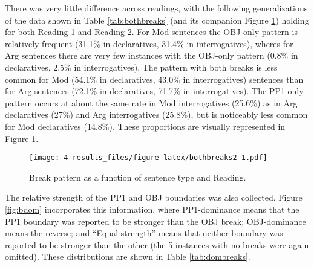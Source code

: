 \documentclass[11pt,oneside]{book}
\begin{document}
There was very little difference across readings, with the following generalizations of the data shown in Table \ref{tab:bothbreaks} (and its companion Figure \ref{fig:bothbreaks2}) holding for both Reading 1 and Reading 2. For Mod sentences the OBJ-only pattern is relatively frequent (31.1\% in declaratives, 31.4\% in interrogatives), wheres for Arg sentences there are very few instances with the OBJ-only pattern (0.8\% in declaratives, 2.5\% in interrogatives). The pattern with both breaks is less common for Mod (54.1\% in declaratives, 43.0\% in interrogatives) sentences than for Arg sentences (72.1\% in declaratives, 71.7\% in interrogatives). The PP1-only pattern occurs at about the same rate in Mod interrogatives (25.6\%) as in Arg declaratives (27\%) and Arg interrogatives (25.8\%), but is noticeably less common for Mod declaratives (14.8\%). These proportions are visually represented in Figure \ref{fig:bothbreaks2}.

\begin{figure}
\centering
\texttt{[image: 4-results\_files/figure-latex/bothbreaks2-1.pdf]}
\caption{\label{fig:bothbreaks2}Break pattern as a function of sentence type and Reading.}
\end{figure}

The relative strength of the PP1 and OBJ boundaries was also collected. Figure \ref{fig:bdom} incorporates this information, where PP1-dominance means that the PP1 boundary was reported to be stronger than the OBJ break; OBJ-dominance means the reverse; and ``Equal strength'' means that neither boundary was reported to be stronger than the other (the 5 instances with no breaks were again omitted). These distributions are shown in Table \ref{tab:dombreaks}.
\end{document}
